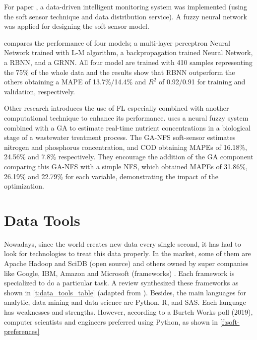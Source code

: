 For paper \cite{Han2018}, a data-driven intelligent monitoring system was implemented (using the soft sensor technique and data distribution service). A fuzzy neural network was applied for designing the soft sensor model.

\cite{Shen2018} compares the performance of four models; a multi-layer perceptron Neural Network trained with \ac{L-M} algorithm, a backpropagation trained Neural Network, a \ac{RBNN}, and a \ac{GRNN}. All four model are trained with 410 samples representing the 75\% of the whole data and the results show that \ac{RBNN} outperform the others obtaining a \ac{MAPE} of 13.7\%/14.4\% and \begin{math}R^2\end{math} of 0.92/0.91 for training and validation, respectively.

Other research introduces the use of \ac{FL} especially combined with another computational technique to enhance its performance. \cite{Huang2015} uses a neural fuzzy system combined with a \ac{GA} to estimate real-time nutrient concentrations in a biological stage of a wastewater treatment process. The GA-NFS soft-sensor estimates nitrogen and phosphorus concentration, and \ac{COD} obtaining \ac{MAPE}s of 16.18\%, 24.56\% and 7.8\% respectively. They encourage the addition of the GA component comparing this GA-NFS with a simple NFS, which obtained \ac{MAPE}s of 31.86\%, 26.19\% and 22.79\% for each variable, demonstrating the impact of the optimization.

\section{Data Tools}
\label{s:Related-Works-Data-Tools}

Nowadays, since the world creates new data every single second, it has had to look for technologies to treat this data properly. In the market, some of them are Apache Hadoop and SciDB (open source) and others owned by super companies like Google, IBM, Amazon and Microsoft (frameworks) \cite{Siddiqui2015}. Each framework is specialized to do a particular task. A review \cite{Valentin-Vargas2012} synthesized these frameworks as shown in \autoref{t:data_tools_table} (adapted from \cite{Valentin-Vargas2012}). Besides, the main languages for analytic, data mining and data science are Python, R, and SAS. Each language has weaknesses and strengths. However, according to a Burtch Works poll (2019), computer scientists and engineers preferred using Python, as shown in \autoref{f:soft-preferences}

